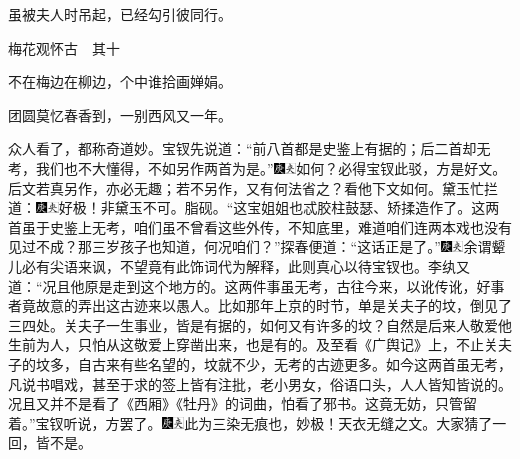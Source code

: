 虽被夫人时吊起，已经勾引彼同行。

梅花观怀古　其十

不在梅边在柳边，个中谁拾画婵娟。

团圆莫忆春香到，一别西风又一年。

众人看了，都称奇道妙。宝钗先说道：“前八首都是史鉴上有据的；后二首却无考，我们也不大懂得，不如另作两首为是。”{\includegraphics[width=3mm]{../Images/00004}\includegraphics[width=3mm]{../Images/00012}\footnotesize \kaishu 如何？必得宝钗此驳，方是好文。后文若真另作，亦必无趣；若不另作，又有何法省之？看他下文如何。}黛玉忙拦道：{\includegraphics[width=3mm]{../Images/00004}\includegraphics[width=3mm]{../Images/00012}\footnotesize \kaishu 好极！非黛玉不可。脂砚。}“这宝姐姐也忒胶柱鼓瑟、矫揉造作了。这两首虽于史鉴上无考，咱们虽不曾看这些外传，不知底里，难道咱们连两本戏也没有见过不成？那三岁孩子也知道，何况咱们？”探春便道：“这话正是了。”{\includegraphics[width=3mm]{../Images/00004}\includegraphics[width=3mm]{../Images/00012}\footnotesize \kaishu 余谓颦儿必有尖语来讽，不望竟有此饰词代为解释，此则真心以待宝钗也。}李纨又道：“况且他原是走到这个地方的。这两件事虽无考，古往今来，以讹传讹，好事者竟故意的弄出这古迹来以愚人。比如那年上京的时节，单是关夫子的坟，倒见了三四处。关夫子一生事业，皆是有据的，如何又有许多的坟？自然是后来人敬爱他生前为人，只怕从这敬爱上穿凿出来，也是有的。及至看《广舆记》上，不止关夫子的坟多，自古来有些名望的，坟就不少，无考的古迹更多。如今这两首虽无考，凡说书唱戏，甚至于求的签上皆有注批，老小男女，俗语口头，人人皆知皆说的。况且又并不是看了《西厢》《牡丹》的词曲，怕看了邪书。这竟无妨，只管留着。”宝钗听说，方罢了。{\includegraphics[width=3mm]{../Images/00004}\includegraphics[width=3mm]{../Images/00012}\footnotesize \kaishu 此为三染无痕也，妙极！天衣无缝之文。}大家猜了一回，皆不是。

